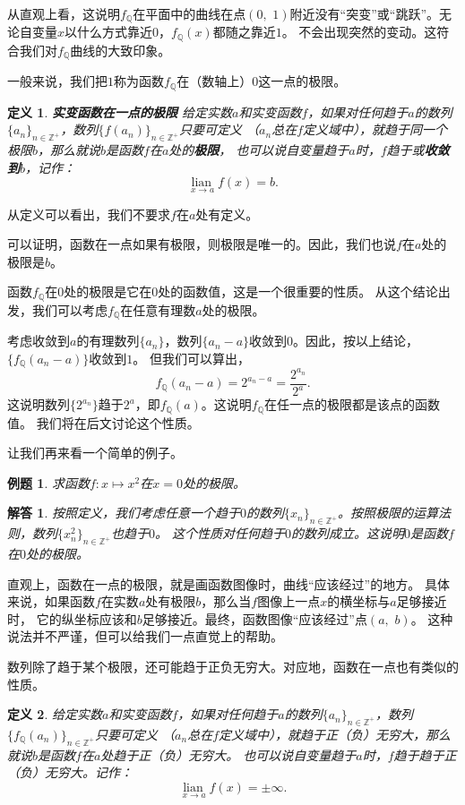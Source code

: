 \documentclass[12pt,UTF8]{ctexbook}
\newcommand\lian[1]{
    \underset{#1}{\operatorname{lian}\,}
}
\newtheorem{df}{定义}[section]
\newtheorem{et}{例题}[section]
\newtheorem*{so}{解答}
\begin{document}
从直观上看，这说明$f_{\mathbb{Q}}$在平面中的曲线在点$(0,\,\,1)$附近没有“突变”或“跳跃”。无论自变量$x$以什么方式靠近$0$，$f_{\mathbb{Q}}(x)$都随之靠近$1$。
不会出现突然的变动。这符合我们对$f_{\mathbb{Q}}$曲线的大致印象。

一般来说，我们把$1$称为函数$f_{\mathbb{Q}}$在（数轴上）$0$这一点的极限。
\begin{df}\textbf{实变函数在一点的极限}
    给定实数$a$和实变函数$f$，如果对任何趋于$a$的数列$\{a_n\}_{n\in\mathbb{Z}^+}$，数列$\{f(a_n)\}_{n\in\mathbb{Z}^+}$只要可定义
    （$a_n$总在$f$定义域中），就趋于同一个极限$b$，那么就说$b$是函数$f$在$a$处的\textbf{极限}，
    也可以说自变量趋于$a$时，$f$趋于或\textbf{收敛到}$b$，记作：
    $$  \lian{x \to a} f(x) = b. $$
\end{df}

从定义可以看出，我们不要求$f$在$a$处有定义。

可以证明，函数在一点如果有极限，则极限是唯一的。因此，我们也说$f$在$a$处的极限是$b$。

函数$f_{\mathbb{Q}}$在$0$处的极限是它在$0$处的函数值，这是一个很重要的性质。
从这个结论出发，我们可以考虑$f_{\mathbb{Q}}$在任意有理数$a$处的极限。

考虑收敛到$a$的有理数列$\{a_n\}$，数列$\{a_n - a\}$收敛到$0$。因此，按以上结论，$\{f_{\mathbb{Q}}(a_n - a)\}$收敛到$1$。
但我们可以算出，
$$f_{\mathbb{Q}}(a_n - a) = 2^{a_n - a} = \frac{2^{a_n}}{2^a}. $$
这说明数列$\{2^{a_n}\}$趋于$2^a$，即$f_{\mathbb{Q}}(a)$。这说明$f_{\mathbb{Q}}$在任一点的极限都是该点的函数值。
我们将在后文讨论这个性质。

让我们再来看一个简单的例子。
\begin{et}
    求函数$f:x\mapsto x^2$在$x=0$处的极限。
\end{et}
\begin{so}
    按照定义，我们考虑任意一个趋于$0$的数列$\{x_n\}_{n\in\mathbb{Z}^+}$。按照极限的运算法则，数列$\{x_n^2\}_{n\in\mathbb{Z}^+}$也趋于$0$。
    这个性质对任何趋于$0$的数列成立。这说明$0$是函数$f$在$0$处的极限。
\end{so}

直观上，函数在一点的极限，就是画函数图像时，曲线“应该经过”的地方。
具体来说，如果函数$f$在实数$a$处有极限$b$，那么当$f$图像上一点$x$的横坐标与$a$足够接近时，
它的纵坐标应该和$b$足够接近。最终，函数图像“应该经过”点$(a,\,\, b)$。
这种说法并不严谨，但可以给我们一点直觉上的帮助。

数列除了趋于某个极限，还可能趋于正负无穷大。对应地，函数在一点也有类似的性质。
\begin{df}
    给定实数$a$和实变函数$f$，如果对任何趋于$a$的数列$\{a_n\}_{n\in\mathbb{Z}^+}$，数列$\{f_{\mathbb{Q}}(a_n)\}_{n\in\mathbb{Z}^+}$只要可定义
    （$a_n$总在$f$定义域中），就趋于正（负）无穷大，那么就说$b$是函数$f$在$a$处趋于正（负）无穷大。
    也可以说自变量趋于$a$时，$f$趋于趋于正（负）无穷大。记作：
    $$  \lian{x \to a} f(x) = \pm\infty. $$
\end{df}
\end{document}

